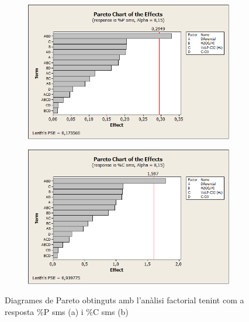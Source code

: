 \documentclass[a4paper]{article}
\begin{document}
\begin{figure}[H]
	\begin{subfigure}{.5\textwidth}
		\centering
		\includegraphics[width=.8\linewidth]{images/Pareto15P}
		\caption{}
		\label{fig:Pareto15P}
	\end{subfigure}%
	\begin{subfigure}{.5\textwidth}
		\centering
		\includegraphics[width=.8\linewidth]{images/Pareto15C}
		\caption{}
		\label{fig:Pareto15C}
	\end{subfigure}
	\caption{Diagrames de Pareto obtinguts amb l’anàlisi factorial tenint com a resposta \%P sms (a) i \%C sms (b)}
	\label{fig:Pareto15}
\end{figure}
\end{document}
